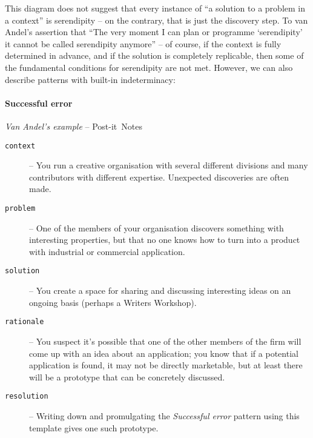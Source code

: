 This diagram does not suggest that every instance of ``a solution to a
problem in a context'' is serendipity -- on the contrary, that is just
the discovery step.  To van Andel's assertion that ``The very moment I
can plan or programme `serendipity' it cannot be called serendipity
anymore'' -- of course, if the context is fully determined in advance,
and if the solution is completely replicable, then some of the
fundamental conditions for serendipity are not met.  However, we can
also describe patterns with built-in indeterminacy:

\begin{mdframed}
\vspace{-.35cm}
\paragraph{Successful error}
\emph{Van Andel's example} -- Post-it\texttrademark\ Notes\\[.05cm]
\begin{description}
\item[{\tt context}] -- You run a creative organisation with several different divisions and many contributors with different expertise.  Unexpected discoveries are often made.
\item[{\tt problem}] -- One of the members of your organisation
  discovers something with interesting properties, but that no one
  knows how to turn into a product with industrial or commercial application.
\item[{\tt solution}] -- You create a space for sharing and discussing
  interesting ideas on an ongoing basis (perhaps a Writers Workshop).
\item[{\tt rationale}] -- You suspect it's possible that one of the
  other members of the firm will come up with an idea about an
  application; you know that if a potential application is found, it
  may not be directly marketable, but at least there will be a
  prototype that can be concretely discussed.
\item[{\tt resolution}] -- Writing down and promulgating the
  \emph{Successful error} pattern using this template gives one such
  prototype.
\end{description}
\end{mdframed}
